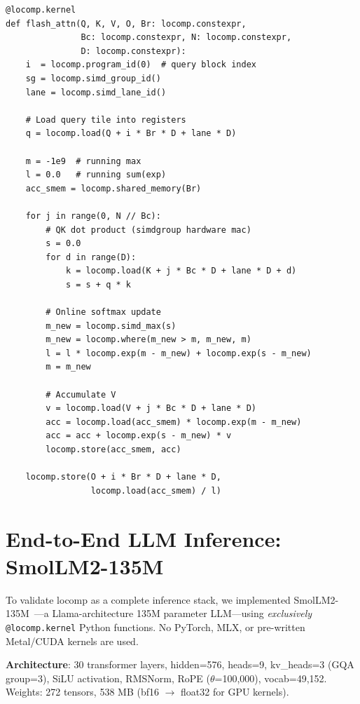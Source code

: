 \documentclass[10pt,twocolumn]{article}
\begin{document}
\begin{lstlisting}[caption={Flash Attention (simplified) in locomp Python DSL.
Compiles to Metal MSL, CUDA C, and HIP C from the same source.},
label={lst:flash}]
@locomp.kernel
def flash_attn(Q, K, V, O, Br: locomp.constexpr,
               Bc: locomp.constexpr, N: locomp.constexpr,
               D: locomp.constexpr):
    i  = locomp.program_id(0)  # query block index
    sg = locomp.simd_group_id()
    lane = locomp.simd_lane_id()

    # Load query tile into registers
    q = locomp.load(Q + i * Br * D + lane * D)

    m = -1e9  # running max
    l = 0.0   # running sum(exp)
    acc_smem = locomp.shared_memory(Br)

    for j in range(0, N // Bc):
        # QK dot product (simdgroup hardware mac)
        s = 0.0
        for d in range(D):
            k = locomp.load(K + j * Bc * D + lane * D + d)
            s = s + q * k

        # Online softmax update
        m_new = locomp.simd_max(s)
        m_new = locomp.where(m_new > m, m_new, m)
        l = l * locomp.exp(m - m_new) + locomp.exp(s - m_new)
        m = m_new

        # Accumulate V
        v = locomp.load(V + j * Bc * D + lane * D)
        acc = locomp.load(acc_smem) * locomp.exp(m - m_new)
        acc = acc + locomp.exp(s - m_new) * v
        locomp.store(acc_smem, acc)

    locomp.store(O + i * Br * D + lane * D,
                 locomp.load(acc_smem) / l)
\end{lstlisting}

\section{End-to-End LLM Inference: SmolLM2-135M}
\label{sec:smollm}

To validate locomp as a complete inference stack, we implemented
SmolLM2-135M~\cite{smollm2}---a Llama-architecture 135M parameter LLM---using
\emph{exclusively} \texttt{@locomp.kernel} Python functions. No PyTorch, MLX,
or pre-written Metal/CUDA kernels are used.

\textbf{Architecture}: 30 transformer layers, hidden=576, heads=9,
kv\_heads=3 (GQA group=3), SiLU activation, RMSNorm, RoPE ($\theta$=100,000),
vocab=49,152. Weights: 272 tensors, 538 MB (bf16 $\to$ float32 for GPU kernels).
\end{document}
